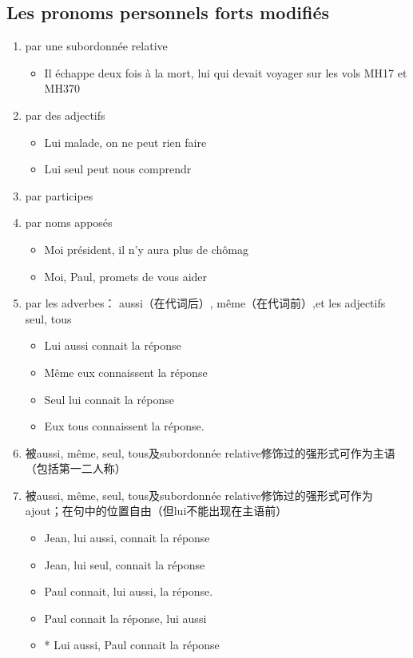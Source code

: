 \documentclass[UTF8]{report}
\begin{document}
\subsection{Les pronoms personnels forts modifiés}
\begin{enumerate}
    \item par une subordonnée relative
    \begin{itemize}
        \item Il échappe deux fois à la mort, lui qui devait voyager sur les vols MH17 et MH370
    \end{itemize}
    \item par des adjectifs
    \begin{itemize}
        \item Lui malade, on ne peut rien faire
        \item Lui seul peut nous comprendr
    \end{itemize}
    \item par participes
    \item par noms apposés
    \begin{itemize}
        \item Moi président, il n’y aura plus de chômag
        \item Moi, Paul, promets de vous aider
    \end{itemize}
    \item par les adverbes： aussi（在代词后）, même（在代词前）,et les adjectifs seul, tous
    \begin{itemize}
        \item Lui aussi connait la réponse
        \item Même eux connaissent la réponse
        \item Seul lui connait la réponse
        \item Eux tous connaissent la réponse.
    \end{itemize}
    \item 被aussi, même, seul, tous及subordonnée relative修饰过的强形式可作为主语（包括第一二人称）
    \item 被aussi, même, seul, tous及subordonnée relative修饰过的强形式可作为ajout；在句中的位置自由（但lui不能出现在主语前）
    \begin{itemize}
        \item Jean, lui aussi, connait la réponse
        \item Jean, lui seul, connait la réponse
        \item Paul connait, lui aussi, la réponse.
        \item Paul connait la réponse, lui aussi
        \item * Lui aussi, Paul connait la réponse
    \end{itemize}
\end{enumerate}
\end{document}
